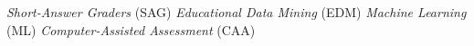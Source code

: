 \textit{Short-Answer Graders} (SAG)
\textit{Educational Data Mining} (EDM)
\textit{Machine Learning} (ML)
\textit{Computer-Assisted Assessment} (CAA)